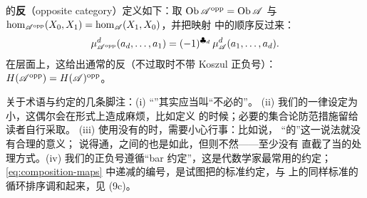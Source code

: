 \trNonunital{}\trACategory{}的\textbf{反\trCategory}（opposite category）定义如下：取
$\operatorname{Ob}\mathscr{A}^{\mathrm{opp}}=\operatorname{Ob}\mathscr{A}$ 与
$\hom_{\mathscr{A}^{\mathrm{opp}}}(X_0,X_1)=\hom_{\mathscr{A}}(X_1,X_0)$，并把\trComposition{}映射
中的顺序反过来：
\begin{equation*}
\mu^d_{\mathscr{A}^{\mathrm{opp}}}(a_d,\ldots,a_1)=(-1)^{\clubsuit_d}\,\mu^d_{\mathscr{A}}(a_1,\ldots,a_d).
\end{equation*}
在\trCohomology{}层面上，这给出通常的反\trCategory{}（不过取时不带 Koszul 正负号）：
$H(\mathscr{A}^{\mathrm{opp}})=H(\mathscr{A})^{\mathrm{opp}}$。

\begin{remark}\label{thm:terminology-conventions}
关于术语与约定的几条脚注：(i) “\trNonunital”其实应当叫“不必\trUnital{}的”。
(ii) 我们的\trCategory{}一律设定为小\trCategory，这偶尔会在形式上造成麻烦，比如定义%
\trTwistedComplex{}的时候；必要的集合论防范措施留给读者自行采取。
(iii) 使用没有\trIdentityMorphism{}的\trCategory{}时，需要小心行事：比如说，
“\trIsomorphic{}的\trObject{}”这一说法就没有合理的意义；\trFullyFaithful\trFunctor{}%
说得通，\trCategory{}之间的\trIsomorphism{}也是如此，但\trEquivalence{}则不然——至少没有
直截了当的处理方式。(iv) 我们的正负号遵循“bar 约定”，这是代数学家最常用的约定；
\eqref{eq:composition-maps} 中递减的编号，是试图把\trMorphism\trComposition{}的标准约定，与%
\trCircle{}上\trMarkedPoint{}的同样标准的循环排序调和起来，见 (9c)。
\end{remark}

